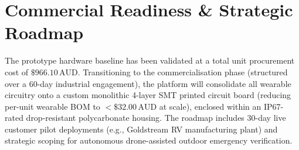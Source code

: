 \section*{Commercial Readiness \& Strategic Roadmap}
The prototype hardware baseline has been validated at a total unit procurement cost of $\$966.10\,\text{AUD}$. Transitioning to the commercialisation phase (structured over a 60-day industrial engagement), the platform will consolidate all wearable circuitry onto a custom monolithic 4-layer SMT printed circuit board (reducing per-unit wearable BOM to $<\$32.00\,\text{AUD}$ at scale), enclosed within an IP67-rated drop-resistant polycarbonate housing. The roadmap includes 30-day live customer pilot deployments (e.g., Goldstream RV manufacturing plant) and strategic scoping for autonomous drone-assisted outdoor emergency verification.

